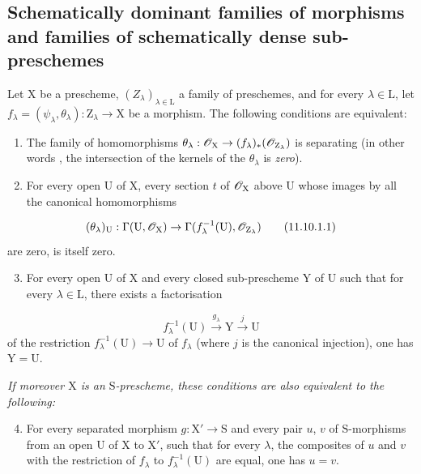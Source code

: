 \subsection{Schematically dominant families of morphisms and families of schematically dense sub\mbox{-}preschemes}
\label{subsection:IV.11.10}

\begin{proposition}[11.10.1]
\label{IV.11.10.1}
Let $\mathrm{X}$ be a prescheme, $(Z_\lambda)_{\lambda\in\mathrm{L}}$ a family of preschemes, and for every $\lambda\in\mathrm{L}$, let $f_\lambda=(\psi_\lambda,\theta_\lambda):\mathrm{Z}_\lambda\to\mathrm{X}$ be a morphism.
The following conditions are equivalent:
\begin{enumerate}[label=\emph{\alph*)}]
  \item The family of homomorphisms $\theta_\lambda:\mathscr{O}_\mathrm{X}\to(f_\lambda)_*(\mathscr{O}_{\mathrm{Z}_\lambda})$ is separating (in other words , the intersection of the kernels of the $\theta_\lambda$ is \emph{zero}).
  \item For every open $\mathrm{U}$ of $\mathrm{X}$, every section $t$ of $\mathscr{O}_\mathrm{X}$ above $\mathrm{U}$ whose images by all the canonical homomorphisms
\end{enumerate}
\[
  (\theta_\lambda)_\mathrm{U}:\Gamma(\mathrm{U},\mathscr{O}_\mathrm{X})\to\Gamma(f_\lambda^{-1}(\mathrm{U}),\mathscr{O}_{\mathrm{Z}_\lambda})
\tag{11.10.1.1}\label{IV.11.10.1.1}
\]
are zero, is itself zero.
\begin{enumerate}[label=\emph{\alph*)}]
\setcounter{enumi}{2}
  \item For every open $\mathrm{U}$ of $\mathrm{X}$ and every closed sub-prescheme $\mathrm{Y}$ of $\mathrm{U}$ such that for every $\lambda\in\mathrm{L}$, there exists a factorisation
\end{enumerate}
\[
  f_\lambda^{-1}(\mathrm{U})\xrightarrow{g_\lambda}\mathrm{Y}\xrightarrow{j}\mathrm{U}
\tag{11.10.1.2}\label{IV.11.10.1.2}
\]
of the restriction $f_\lambda^{-1}(\mathrm{U})\to\mathrm{U}$ of $f_\lambda$ (where $j$ is the canonical injection), one has $\mathrm{Y}=\mathrm{U}$.

\emph{If moreover $\mathrm{X}$ is an $\mathrm{S}$-prescheme, these conditions are also equivalent to the following:}
\begin{enumerate}[label=\emph{\alph*)}]
\setcounter{enumi}{3}
  \item For every separated morphism $g:\mathrm{X}'\to\mathrm{S}$ and every pair $u$, $v$ of $\mathrm{S}$-morphisms from an open $\mathrm{U}$ of $\mathrm{X}$ to $\mathrm{X}'$, such that for every $\lambda$, the composites of $u$ and $v$ with the restriction of $f_\lambda$ to $f_\lambda^{-1}(\mathrm{U})$ are equal, one has $u=v$.
\end{enumerate}
\end{proposition}

